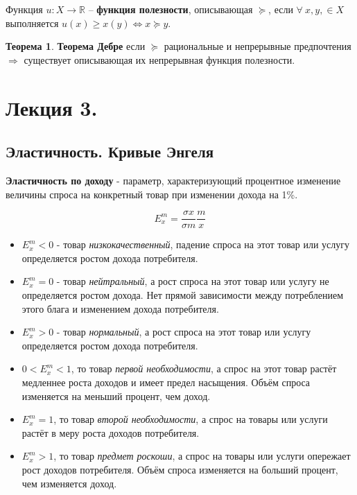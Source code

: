 \documentclass[reqno]{article}
\theoremstyle{definition}
\theoremstyle{definition}
\theoremstyle{definition}
\theoremstyle{definition}
\theoremstyle{definition}
\theoremstyle{definition}
\newtheorem{thm}{Теорема}[section]
\theoremstyle{definition}
\theoremstyle{definition}
\theoremstyle{definition}
\begin{document}
	Функция $u : X \rightarrow \mathds{R}$ -- \textbf{функция полезности}, описывающая $\succeq$, если $\forall\ x, y, \in X$ выполняется $u(x) \geq x(y) \Leftrightarrow x \succeq y$.
	
	\begin{thm}
		\textbf{Теорема Дебре} если $\succeq$ рациональные и непрерывные предпочтения $\Rightarrow$ существует описывающая их непрерывная функция полезности.
	\end{thm}
	\newpage
	
	\section{Лекция 3.}
	
	\subsection{Эластичность. Кривые Энгеля}			
	
	\textbf{Эластичность по доходу} - параметр, характеризующий процентное изменение величины спроса на конкретный товар при изменении дохода на 1\%.
	
	$$E_x^m = \dfrac{\sigma x}{\sigma m} \dfrac{m}{x}$$
	
	\begin{itemize}
		\item $E_{x}^{m}<0$ - товар \emph{низкокачественный}, падение спроса на этот товар или услугу определяется ростом дохода потребителя.
		
		\item $E_x^m=0$ - товар \emph{нейтральный}, а рост спроса на этот товар или услугу не определяется ростом дохода. Нет прямой зависимости между потреблением этого блага и изменением дохода потребителя.
		
		\item $E_x^m>0$ - товар \emph{нормальный}, а рост спроса на этот товар или услугу определяется ростом дохода потребителя.
		
		\item $0<E_x^m<1$, то товар \emph{первой необходимости}, а спрос на этот товар растёт медленнее роста доходов и имеет предел насыщения. Объём спроса изменяется на меньший процент, чем доход.
		
		\item $E_x^m=1$, то товар \emph{второй необходимости}, а спрос на товары или услуги растёт в меру роста доходов потребителя.
		
		\item $E_x^m>1$, то товар \emph{предмет роскоши}, а спрос на товары или услуги опережает рост доходов потребителя. Объём спроса изменяется на больший процент, чем изменяется доход.
	\end{itemize}
	
\end{document}
